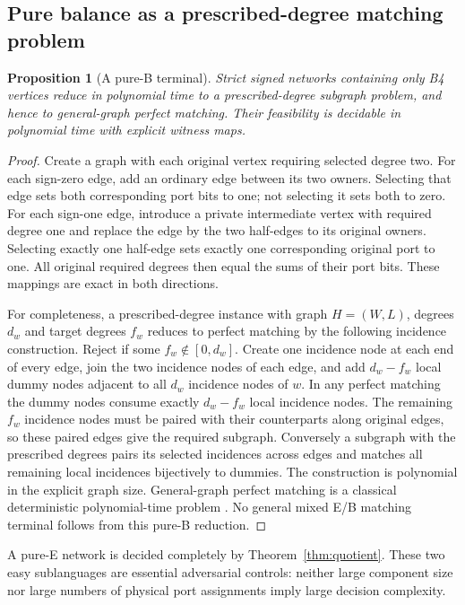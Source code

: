 \documentclass[11pt,letterpaper]{article}
\newtheorem{proposition}[theorem]{Proposition}
\theoremstyle{definition}
\begin{document}
\subsection{Pure balance as a prescribed-degree matching problem}
\begin{proposition}[A pure-B terminal]\label{prop:factor}
Strict signed networks containing only B4 vertices reduce in polynomial time to a prescribed-degree subgraph problem, and hence to general-graph perfect matching. Their feasibility is decidable in polynomial time with explicit witness maps.
\end{proposition}
\begin{proof}
Create a graph with each original vertex requiring selected degree two. For each sign-zero edge, add an ordinary edge between its two owners. Selecting that edge sets both corresponding port bits to one; not selecting it sets both to zero. For each sign-one edge, introduce a private intermediate vertex with required degree one and replace the edge by the two half-edges to its original owners. Selecting exactly one half-edge sets exactly one corresponding original port to one. All original required degrees then equal the sums of their port bits. These mappings are exact in both directions.

For completeness, a prescribed-degree instance with graph \(H=(W,L)\), degrees \(d_w\) and target degrees \(f_w\) reduces to perfect matching by the following incidence construction. Reject if some \(f_w\notin[0,d_w]\). Create one incidence node at each end of every edge, join the two incidence nodes of each edge, and add \(d_w-f_w\) local dummy nodes adjacent to all \(d_w\) incidence nodes of \(w\). In any perfect matching the dummy nodes consume exactly \(d_w-f_w\) local incidence nodes. The remaining \(f_w\) incidence nodes must be paired with their counterparts along original edges, so these paired edges give the required subgraph. Conversely a subgraph with the prescribed degrees pairs its selected incidences across edges and matches all remaining local incidences bijectively to dummies. The construction is polynomial in the explicit graph size. General-graph perfect matching is a classical deterministic polynomial-time problem \cite{edmonds1965}. No general mixed E/B matching terminal follows from this pure-B reduction.
\end{proof}
A pure-E network is decided completely by Theorem~\ref{thm:quotient}. These two easy sublanguages are essential adversarial controls: neither large component size nor large numbers of physical port assignments imply large decision complexity.
\end{document}
